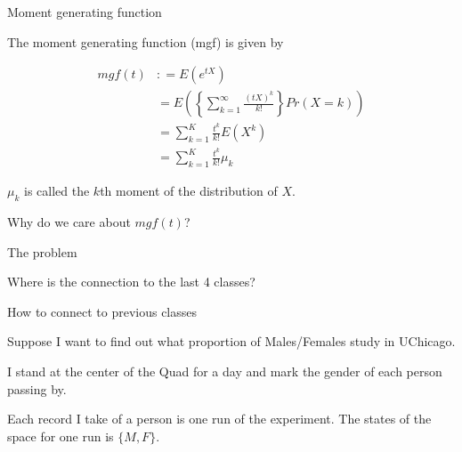\documentclass{beamer}\usepackage[]{graphicx}\usepackage[]{color}
\begin{document}
\begin{frame}[fragile]{Moment generating function \;\;}

The moment generating function (mgf) is given by

\begin{align}
mgf(t) & : = E(e^{tX}) \\
& = E \left ( \left \{ \sum_{k=1}^{\infty} \frac{(tX)^{k}}{k!} \right \} Pr(X=k) \right) \\
& = \sum_{k=1}^{K} \frac{t^{k}}{k!} E \left ( X^{k} \right) \\
& = \sum_{k=1}^{K} \frac{t^{k}}{k!} \mu_{k}
\end{align}

$\mu_{k}$ is called the $k$th moment of the distribution of $X$. \pause \newline

Why do we care about $mgf(t)$?

\end{frame}

\begin{frame}[fragile]{The problem \;\;}

\begin{center}
\Huge{Where is the connection to the last 4 classes?}
\end{center}

\end{frame}


\begin{frame}[fragile]{How to connect to previous classes \;\;}

Suppose I want to find out what proportion of Males/Females study in UChicago. \pause \newline

I stand at the center of the Quad for a day and mark the gender of each person passing by. \pause \newline

Each record I take of a person is one run of the experiment. The states of the space
for one run is $\{ M, F \}$.

\end{frame}
\end{document}
